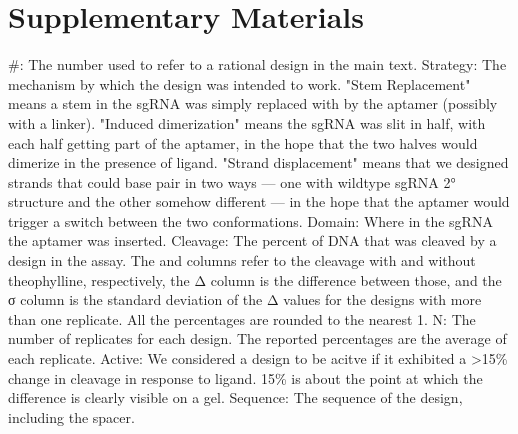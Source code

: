 \documentclass[10pt,oneside]{article}
\begin{document}
\section{Supplementary Materials}



 \#: The number used to refer to a rational design in the main text.
 Strategy: The mechanism by which the design was intended to work.  "Stem 
 Replacement" means a stem in the sgRNA was simply replaced with by the aptamer 
 (possibly with a linker).  "Induced dimerization" means the sgRNA was slit in 
 half, with each half getting part of the aptamer, in the hope that the two 
 halves would dimerize in the presence of ligand.  "Strand displacement" means 
 that we designed strands that could base pair in two ways --- one with wildtype 
 sgRNA 2° structure and the other somehow different --- in the hope that the 
 aptamer would trigger a switch between the two conformations.
 Domain: Where in the sgRNA the aptamer was inserted.  
 Cleavage: The percent of DNA that was cleaved by a design in the \invitro{} 
 assay.  The \apo{} and \holo{} columns refer to the cleavage with and without 
 theophylline, respectively, the Δ column is the difference between those, and 
 the σ column is the standard deviation of the Δ values for the designs with 
 more than one replicate.  All the percentages are rounded to the nearest 1.
 N: The number of replicates for each design.  The reported percentages are the 
 average of each replicate.
 Active: We considered a design to be acitve if it exhibited a >15\% change in 
 cleavage in response to ligand.  15\% is about the point at which the 
 difference is clearly visible on a gel.
 Sequence: The sequence of the design, including the spacer.




\printbibliography[title=References]
\end{document}
